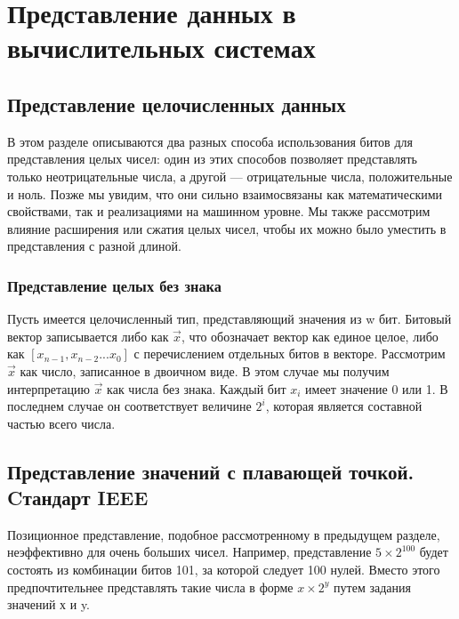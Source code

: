 \chapter{Представление данных в вычислительных системах}



\section{Представление целочисленных данных}

В этом разделе описываются два разных способа использования битов для представления целых чисел: один из этих способов позволяет представлять только неотрицательные числа, а другой --- отрицательные числа, положительные и ноль. Позже мы увидим, что они сильно взаимосвязаны как математическими свойствами, так и реализациями на машинном уровне. Мы также рассмотрим влияние расширения или сжатия целых чисел, чтобы их можно было уместить в представления с разной длиной.

\subsection{Представление целых без знака}

Пусть имеется целочисленный тип, представляющий значения из w бит. Битовый вектор записывается либо как $\vec{x}$, что обозначает вектор как единое целое, либо как $[x_{n-1}, x_{n-2}...x_0]$ с перечислением отдельных битов в векторе. Рассмотрим $\vec{x}$ как число, записанное в двоичном виде. В этом случае мы получим интерпретацию $\vec{x}$ как числа без знака. Каждый бит $x_i$ имеет значение 0 или 1. В последнем случае он соответствует величине $2^i$, которая является составной частью всего числа.



\section{Представление значений с плавающей точкой. Cтандарт IEEE}

Позиционное представление, подобное рассмотренному в предыдущем разделе, неэффективно для очень больших чисел. Например, представление $5 × 2^{100}$ будет состоять из комбинации битов 101, за которой следует 100 нулей. Вместо этого предпочтительнее представлять такие числа в форме $x × 2^y$ путем задания значений х и y.

